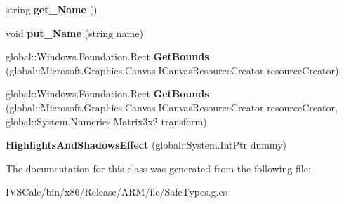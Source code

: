 \begin{DoxyCompactItemize}
\item 
\mbox{\label{class_microsoft_1_1_graphics_1_1_canvas_1_1_effects_1_1_highlights_and_shadows_effect_a40bbb17e727f93789ac14132f19329e3}} 
string {\bfseries get\+\_\+\+Name} ()
\item 
\mbox{\label{class_microsoft_1_1_graphics_1_1_canvas_1_1_effects_1_1_highlights_and_shadows_effect_acf20a493f1e28673d987f629c6077443}} 
void {\bfseries put\+\_\+\+Name} (string name)
\item 
\mbox{\label{class_microsoft_1_1_graphics_1_1_canvas_1_1_effects_1_1_highlights_and_shadows_effect_a66405063039c09cfa97133d2a4735b0b}} 
global\+::\+Windows.\+Foundation.\+Rect {\bfseries Get\+Bounds} (global\+::\+Microsoft.\+Graphics.\+Canvas.\+I\+Canvas\+Resource\+Creator resource\+Creator)
\item 
\mbox{\label{class_microsoft_1_1_graphics_1_1_canvas_1_1_effects_1_1_highlights_and_shadows_effect_a52c38c5ad7bad6373c8a4bfa4c833cdf}} 
global\+::\+Windows.\+Foundation.\+Rect {\bfseries Get\+Bounds} (global\+::\+Microsoft.\+Graphics.\+Canvas.\+I\+Canvas\+Resource\+Creator resource\+Creator, global\+::\+System.\+Numerics.\+Matrix3x2 transform)
\item 
\mbox{\label{class_microsoft_1_1_graphics_1_1_canvas_1_1_effects_1_1_highlights_and_shadows_effect_a49c24ba8cbbe709553a047ed0a174cd5}} 
{\bfseries Highlights\+And\+Shadows\+Effect} (global\+::\+System.\+Int\+Ptr dummy)
\end{DoxyCompactItemize}


The documentation for this class was generated from the following file\+:\begin{DoxyCompactItemize}
\item 
I\+V\+S\+Calc/bin/x86/\+Release/\+A\+R\+M/ilc/Safe\+Types.\+g.\+cs\end{DoxyCompactItemize}
